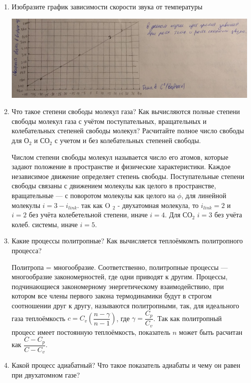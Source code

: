 \documentclass[12pt,a4paper]{article}%
\begin{document}
\begin{enumerate}
	\item Изобразите график зависимости скорости звука от температуры
	
	\includegraphics[width = 1\linewidth]{g}
	
	\item Что такое степени свободы молекул газа? Как вычисляются полные степени свободы молекул газа с учётом поступательных, вращательных и колебательных степеней свободы молекул? Расчитайте полное число свободы для О$ _2 $ и СО$ _2 $ с учетом и без колебательных степеней свободы.
	
	Числом степени свободы молекул называется число его атомов, которые задают положение в пространстве и физические характеристики. Каждое независимое движение определяет степень свободы. Поступательные степени свободы связаны с движением молекулы как целого в пространстве, вращательные --- с поворотом молекулы как целого на $ \phi $, для линейной молекулы $ i = 3 - i_{link} $. так как O $ _2 $ - двухатомная молекула, то $ i_{link} = 2 $ и $ i = 2 $ без учёта колебетельной степени, иначе $ i = 4 $. Для СО$ _2 $ $ i = 3 $ без учёта колеб. системы, иначе $ i = 5 $.
	
	\item Какие процессы политропные? Как вычисляется теплоёмкомть политропного процесса?
	
	Политропа = многообразие. Соответственно, политропные процессы --- многообразие закономерностей, где одни приводят к другим. Процессы, подчинающиеся закономерному энергетическому взаимодействию, при котором все члены первого закона термодинамики будут в строгом соотношении друг к другу, называются политропными, так, для идеального газа теплоёмкость $ c = C_v(\dfrac{n - \gamma}{n-1}) $, где $ \gamma = \dfrac{C_p}{C_v} $. Так как политропный процесс имеет постоянную теплоёмкость, показатель $ n $ может быть расчитан как $ \dfrac{C-C_p}{C-C_v} $.
	
	\item Какой процесс адиабатный? Что такое показатель адиабаты и чему он равен при двухатомном газе?
	

\end{enumerate}
\end{document}

